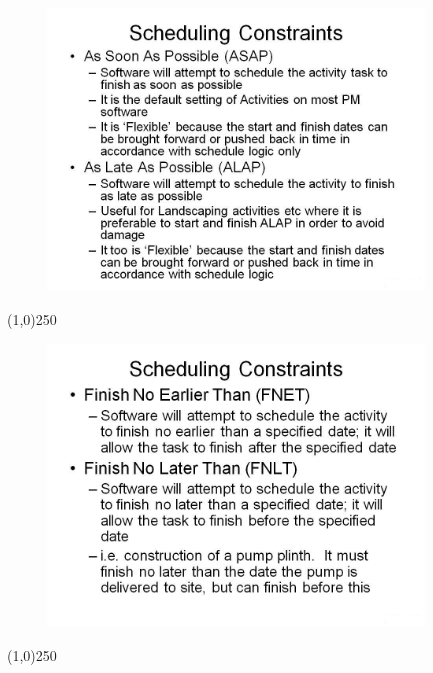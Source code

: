\begin{frame}
\begin{figure}
	\centering
		\includegraphics[width = 10.0cm]{oldnotes/Slide184.jpg}
\end{figure}
\end{frame}
\begin{center}\line(1,0){250}\end{center}




\begin{frame}
\begin{figure}
	\centering
		\includegraphics[width = 10.0cm]{oldnotes/Slide185.jpg}
\end{figure}
\end{frame}
\begin{center}\line(1,0){250}\end{center}




